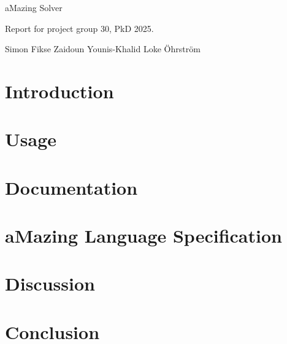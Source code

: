 \documentclass[12pt, a4paper]{article}
\begin{document}
\begin{titlepage}

    \begin{center}

        \begin{LARGE}
            aMazing Solver
        \end{LARGE}

        \vspace{5mm}

        \begin{large}
            Report for project group 30, PkD 2025.
        \end{large}

        \vspace{5mm}

        Simon Fikse \quad Zaidoun Younis-Khalid \quad Loke Öhrström

    \end{center}
\end{titlepage}

\newpage
\tableofcontents
\newpage

\section{Introduction}



\section{Usage}



\section{Documentation}

\newpage

\section{aMazing Language Specification}



\newpage

\section{Discussion}

\section{Conclusion}
\end{document}
